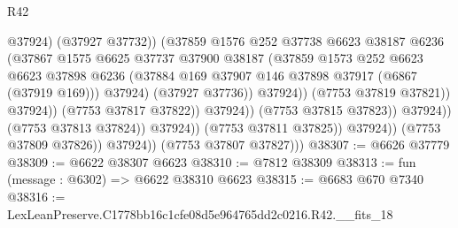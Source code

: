\begin{lexlean}{R42}
\begin{coremodule}
{                                                  @37924)
                                                (@37927 @37732))
                                              (@37859
                                                @1576
                                                @252
                                                @37738
                                                @6623
                                                @38187
                                                @6236
                                                (@37867
                                                  @1575
                                                  @6625
                                                  @37737
                                                  @37900
                                                  @38187
                                                  (@37859
                                                    @1573
                                                    @252
                                                    @6623
                                                    @6623
                                                    @37898
                                                    @6236
                                                    (@37884
                                                      @169
                                                      @37907
                                                      @146
                                                      @37898
                                                      @37917
                                                      (@6867 (@37919 @169)))
                                                    @37924)
                                                  (@37927 @37736))
                                                @37924))
                                            (@7753 @37819 @37821))
                                          @37924))
                                      (@7753 @37817 @37822))
                                    @37924))
                                (@7753 @37815 @37823))
                              @37924))
                          (@7753 @37813 @37824))
                        @37924))
                    (@7753 @37811 @37825))
                  @37924))
              (@7753 @37809 @37826))
            @37924))
        (@7753 @37807 @37827)))
@38307 := @6626 @37779
@38309 := @6622 @38307 @6623
@38310 := @7812 @38309
@38313 := fun (message : @6302) => @6622 @38310 @6623
@38315 := @6683 @670 @7340
@38316 := LexLeanPreserve.C1778bb16c1cfe08d5e964765dd2c0216.R42.__fits_18
}
\end{coremodule}
\end{lexlean}
